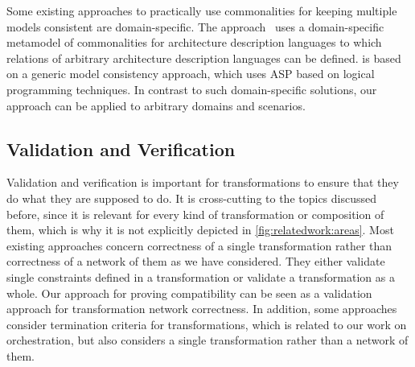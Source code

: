 Some existing approaches to practically use commonalities for keeping multiple models consistent are domain-specific.
The \dually approach~\cite{malavolta2010ADLInteroperability-TSE, eramo2012Dually-SoSym} uses a domain-specific metamodel of commonalities for architecture description languages to which relations of arbitrary architecture description languages can be defined.
\dually is based on a generic model consistency approach, which uses \gls{ASP} based on logical programming techniques.
In contrast to such domain-specific solutions, our \commonalities approach can be applied to arbitrary domains and scenarios.


\subsection{Validation and Verification}

Validation and verification is important for transformations to ensure that they do what they are supposed to do.
It is cross-cutting to the topics discussed before, since it is relevant for every kind of transformation or composition of them, which is why it is not explicitly depicted in \autoref{fig:relatedwork:areas}.
Most existing approaches concern correctness of a single transformation rather than correctness of a network of them as we have considered.
They either validate single constraints defined in a transformation or validate a transformation as a whole.
Our approach for proving compatibility can be seen as a validation approach for transformation network correctness.
In addition, some approaches consider termination criteria for transformations, which is related to our work on orchestration, but also considers a single transformation rather than a network of them.

